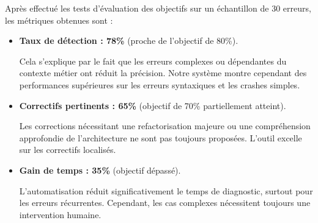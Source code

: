 \documentclass[12pt,a4paper]{report}
\begin{document}
	Après effectué les tests d'évaluation des objectifs sur un échantillon de 30 erreurs, les métriques obtenues sont :
	
	\begin{itemize}
		
		\item \textbf{Taux de détection : 78\%} (proche de l’objectif de 80\%).
		
		Cela s'explique par le fait que les erreurs complexes ou dépendantes du contexte métier ont réduit la précision. Notre système montre cependant des performances supérieures sur les erreurs syntaxiques et les crashes simples.
		
		\item \textbf{Correctifs pertinents : 65\%} (objectif de 70\% partiellement atteint).
		
		Les corrections nécessitant une refactorisation majeure ou une compréhension approfondie de l’architecture ne sont pas toujours proposées. L’outil excelle sur les correctifs localisés.
		
		\item \textbf{Gain de temps : 35\%} (objectif dépassé).
		
		L’automatisation réduit significativement le temps de diagnostic, surtout pour les erreurs récurrentes. Cependant, les cas complexes nécessitent toujours une intervention humaine.
		
	\end{itemize}
	
\end{document}
